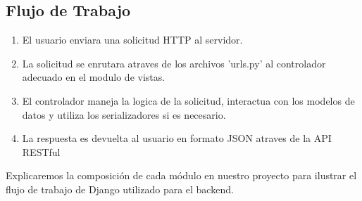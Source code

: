 \subsection*{Flujo de Trabajo}
\begin{enumerate}
	\item El usuario enviara una solicitud HTTP al servidor.
	\item La solicitud se enrutara atraves de los archivos 'urls.py' al controlador adecuado en el modulo de vistas.
	\item El controlador maneja la logica de la solicitud, interactua con los modelos de datos y utiliza los serializadores si es necesario.
	\item La respuesta es devuelta al usuario en formato JSON atraves de la API RESTful
\end{enumerate}
Explicaremos la composición de cada módulo en nuestro proyecto para ilustrar el flujo de trabajo de Django utilizado para el backend.
